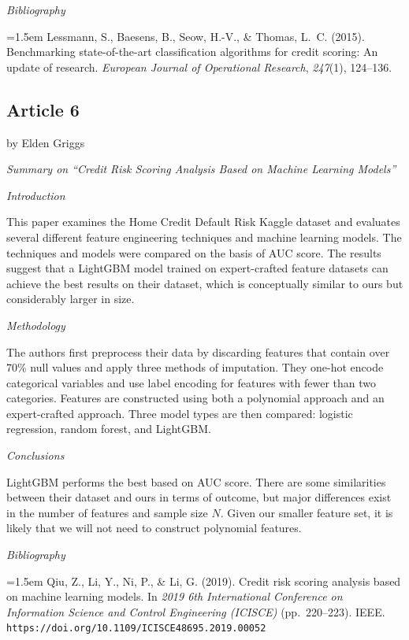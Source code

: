 \documentclass[letterpaper]{article}
\begin{document}
	\medskip
	
	\textit{Bibliography}
	
	\hangindent=1.5em
	Lessmann, S., Baesens, B., Seow, H.-V., \& Thomas, L.~C. (2015). Benchmarking state-of-the-art classification algorithms for credit scoring: An update of research. \textit{European Journal of Operational Research}, \textit{247}(1), 124--136.

	
	\subsection{Article 6}
	
	{\color{deepred} by Elden Griggs}
	
		\textit{Summary on ``Credit Risk Scoring Analysis Based on Machine Learning Models''}

	
	\textit{Introduction}
	
	This paper examines the Home Credit Default Risk Kaggle dataset and evaluates several different feature engineering techniques and machine learning models. The techniques and models were compared on the basis of AUC score. The results suggest that a LightGBM model trained on expert-crafted feature datasets can achieve the best results on their dataset, which is conceptually similar to ours but considerably larger in size.
	
	\medskip
	
	\textit{Methodology}
	
	The authors first preprocess their data by discarding features that contain over 70\% null values and apply three methods of imputation. They one-hot encode categorical variables and use label encoding for features with fewer than two categories. Features are constructed using both a polynomial approach and an expert-crafted approach. Three model types are then compared: logistic regression, random forest, and LightGBM.
	
	\medskip
	
	\textit{Conclusions}
	
	LightGBM performs the best based on AUC score. There are some similarities between their dataset and ours in terms of outcome, but major differences exist in the number of features and sample size $N$. Given our smaller feature set, it is likely that we will not need to construct polynomial features.
	
	\medskip
	
	\textit{Bibliography}
	
	\hangindent=1.5em
	Qiu, Z., Li, Y., Ni, P., \& Li, G. (2019). Credit risk scoring analysis based on machine learning models. In \textit{2019 6th International Conference on Information Science and Control Engineering (ICISCE)} (pp.\ 220--223). IEEE. \texttt{https://doi.org/10.1109/ICISCE48695.2019.00052}
		
\end{document}
